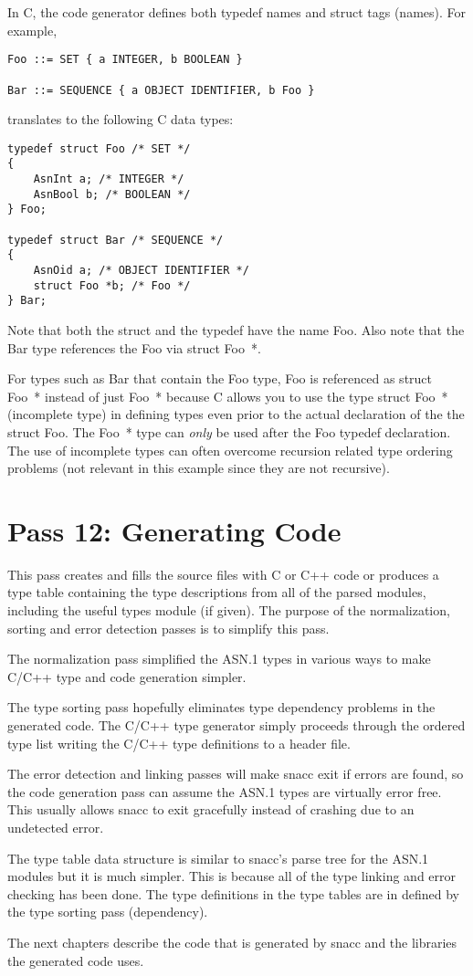 In C, the code generator defines both {\C typedef} names and
{\C struct} tags (names).  For example,
\begin{verbatim}
Foo ::= SET { a INTEGER, b BOOLEAN }

Bar ::= SEQUENCE { a OBJECT IDENTIFIER, b Foo }
\end{verbatim}
translates to the following C data types:
\begin{verbatim}
typedef struct Foo /* SET */
{
    AsnInt a; /* INTEGER */
    AsnBool b; /* BOOLEAN */
} Foo;

typedef struct Bar /* SEQUENCE */
{
    AsnOid a; /* OBJECT IDENTIFIER */
    struct Foo *b; /* Foo */
} Bar;
\end{verbatim}

Note that both the {\C struct} and the {\C typedef} have the name
{\C Foo}.  Also note that the Bar type references the {\C Foo} via
{\C struct Foo~*}.

For types such as {\C Bar} that contain the {\C Foo} type,
{\C Foo} is referenced as {\C struct Foo~*} instead of just
{\C Foo~*} because C allows you to use the type {\C struct Foo~*}
(incomplete type) in defining types even prior to the actual
declaration of the the {\C struct Foo}. The {\C Foo~*} type can
{\em only} be used after the {\C Foo typedef} declaration.  The use
of incomplete types can often overcome recursion related type ordering
problems (not relevant in this example since they are not recursive).

\section{\label{comp-pass12-section}Pass 12: Generating Code}

This pass creates and fills the source files with C or C++ code or
produces a type table containing the type descriptions from all of the
parsed modules, including the useful types module (if given).  The
purpose of the normalization, sorting and error detection passes is to
simplify this pass.

The normalization pass simplified the ASN.1 types in various ways to
make C/C++ type and code generation simpler.

The type sorting pass hopefully eliminates type dependency problems in the
generated code.  The C/C++ type generator simply proceeds through the
ordered type list writing the C/C++ type definitions to a header file.

The error detection and linking passes will make snacc exit if errors
are found, so the code generation pass can assume the ASN.1 types are
virtually error free.  This usually allows snacc to exit gracefully
instead of crashing due to an undetected error.

The type table data structure is similar to snacc's parse tree for the
ASN.1 modules but it is much simpler.  This is because all of the type
linking and error checking has been done.  The type definitions in the
type tables are in defined by the type sorting pass (dependency).

The next chapters describe the code that is generated by snacc and the
libraries the generated code uses.
